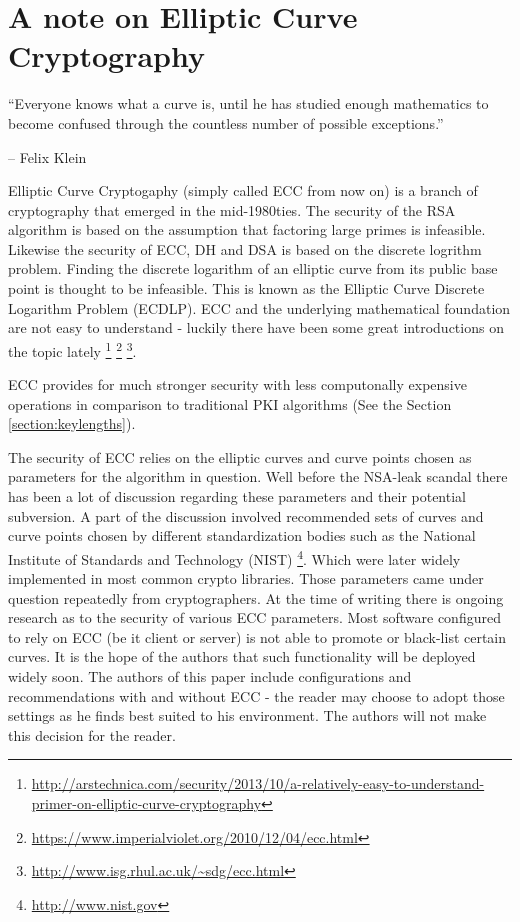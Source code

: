 \section{A note on Elliptic Curve Cryptography}
\label{section:EllipticCurveCryptography}


\epigraph{``Everyone knows what a curve is, until he has studied enough mathematics to become confused through the countless number of possible exceptions.''}{-- Felix Klein }

Elliptic Curve Cryptogaphy (simply called ECC from now on) is a branch of 
cryptography that emerged in the mid-1980ties.
The security of the RSA algorithm is based on the assumption that factoring 
large primes is infeasible. Likewise the security of ECC, DH and DSA is 
based on the discrete logrithm problem\cite{Wikipedia:Discrete,McC90,WR13}.
Finding the discrete logarithm of an elliptic curve from its public base
point is thought to be infeasible. This is known as the Elliptic Curve Discrete 
Logarithm Problem (ECDLP). ECC and the underlying mathematical foundation are not easy 
to understand - luckily there have been some great introductions on the topic lately
\footnote{\url{http://arstechnica.com/security/2013/10/a-relatively-easy-to-understand-primer-on-elliptic-curve-cryptography}}
\footnote{\url{https://www.imperialviolet.org/2010/12/04/ecc.html}}
\footnote{\url{http://www.isg.rhul.ac.uk/~sdg/ecc.html}}.

ECC provides for much stronger security with less computonally expensive
operations in comparison to traditional PKI algorithms (See the Section \ref{section:keylengths}).


The security of ECC relies on the elliptic curves and curve points chosen
as parameters for the algorithm in question. Well before the NSA-leak scandal
there has been a lot of discussion regarding these parameters and their 
potential subversion. A part of the discussion involved recommended sets 
of curves and curve points chosen by different standardization bodies such 
as the National Institute of Standards and Technology (NIST) 
\footnote{\url{http://www.nist.gov}}. Which were later widely implemented 
in most common crypto libraries. Those parameters came under question 
repeatedly from cryptographers\cite{BL13,Sch13b,W13}.
At the time of writing there is ongoing research as to the security of 
various ECC parameters\cite{DJBSC}.
Most software configured to rely on ECC (be it client or server) is
not able to promote or black-list certain curves. It is the hope of
the authors that such functionality will be deployed widely soon.
The authors of this paper include configurations and recommendations
with and without ECC - the reader may choose to adopt those settings
as he finds best suited to his environment. The authors will not make
this decision for the reader.


